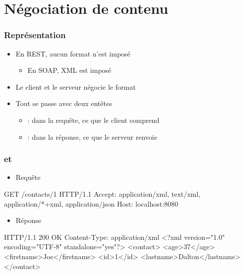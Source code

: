 \section{Négociation de contenu}


\begin{frame}
 \frametitle{Représentation}
 \begin{itemize}
  \item En REST, aucun format n'est imposé
  \begin{itemize}
   \item En SOAP, XML est imposé
  \end{itemize}
  \item Le client et le serveur négocie le format
  \item Tout se passe avec deux entêtes
  \begin{itemize}
   \item {} : dans la requête, ce que le client comprend
   \item {} : dans la réponse, ce que le serveur renvoie
  \end{itemize}
 \end{itemize}
\end{frame}

\begin{frame}[fragile]
 \frametitle{ et }
 \begin{itemize}
  \item Requête
 \end{itemize}
 \begin{textcode}
GET /contacts/1 HTTP/1.1
Accept: application/xml, text/xml, application/*+xml, application/json
Host: localhost:8080
 \end{textcode}

 \begin{itemize}
  \item Réponse
 \end{itemize}
 \begin{textcode}
HTTP/1.1 200 OK
Content-Type: application/xml
<?xml version="1.0" encoding="UTF-8" standalone="yes"?>
<contact>
  <age>37</age>
  <firstname>Joe</firstname>
  <id>1</id>
  <lastname>Dalton</lastname>
</contact>
 \end{textcode}

\end{frame}

